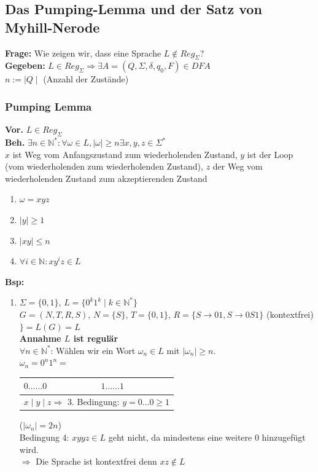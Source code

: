 \documentclass[a4paper,10pt,landscape,twocolumn]{article}
\newcommand{\NN}{\mathbb{N}} %
\newcommand{\Bold}[1]{\textbf{#1}} %
\newcommand{\Ra}{\Rightarrow}
\begin{document}
\subsection{Das Pumping-Lemma und der Satz von Myhill-Nerode}
\Bold{Frage:} Wie zeigen wir, dass eine Sprache $L\notin Reg_\Sigma$?\\
\Bold{Gegeben:} $L\in Reg_\Sigma\Ra\exists A=(Q,\Sigma,\delta,q_0,F)\in DFA$\\
$n:=\mid Q\mid$ (Anzahl der Zust\"ande)
\subsubsection{Pumping Lemma}
\Bold{Vor.} $L\in Reg_\Sigma$\\
\Bold{Beh.} $\exists n \in \NN^*: \forall\omega\in L,\mid\omega\mid\geq n\exists x,y,z\in\Sigma^*$\\
$x$ ist Weg vom Anfangszustand zum wiederholenden Zustand, $y$ ist der Loop (vom wiederholenden zum wiederholenden Zustand), $z$ der Weg vom wiederholenden Zustand zum akzeptierenden Zustand
\begin{enumerate}
 \item $\omega=xyz$
 \item $\mid y\mid \geq 1$
 \item $\mid xy\mid\leq n$
 \item $\forall i\in \NN: xy^iz\in L$
\end{enumerate}
\Bold{Bsp:}
\begin{enumerate}
 \item $\Sigma=\{0,1\}$, $L=\{0^k1^k\mid k\in \NN^*\}$\\
 $G=(N,T,R,S)$, $N=\{S\}$, $T=\{0,1\}$, $R=\{S\to 01,S\to0S1\}$ (kontextfrei) $\} = L(G)=L$\\
 \Bold{Annahme $L$ ist regul\"ar}\\
 $\forall n\in\NN^*$: W\"ahlen wir ein Wort $\omega_n\in L$ mit $\mid\omega_n\mid\geq n$.\\
 $\omega_n=0^n1^n=$
 \begin{tabular}{|l|l|}
  $0\dots\dots0$&$1\dots\dots1$\\\hline
  \multicolumn{2}{|l|}{$x\mid y\mid z\Ra$ 3. Bedingung: $y=0\dots0\geq1$}
 \end{tabular}
  ($\mid\omega_n\mid=2n$)\\
  Bedingung 4: $xyyz\in L$ geht nicht, da mindestens eine weitere 0 hinzugef\"ugt wird.\\
  $\Ra $ Die Sprache ist kontextfrei denn $xz\notin L$
\end{enumerate}
\end{document}
